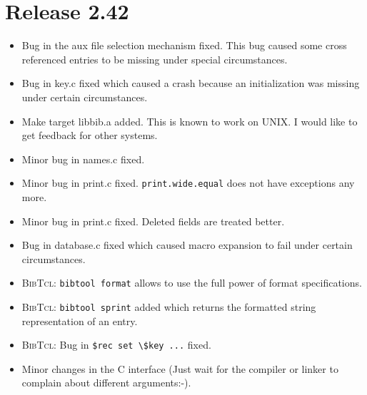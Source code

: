 \documentclass[11pt,a4paper]{scrartcl}
\newcommand\rsc[1]{\texttt{#1}}
\newcommand\File[1]{\textsf{#1}}
\newcommand\BibTcl{\textsc{BibTcl}}
\newenvironment{Release}[2]{\section*{Release #1}\begin{itemize}}{\end{itemize}}
\newenvironment{Fix}[1]{\item }{}
\newenvironment{New}[1]{\item }{}
\newenvironment{Update}[1]{\item }{}
\begin{document}
\begin{Release}{2.42}{}
  \begin{Fix}{gene}
    Bug in the aux file selection mechanism fixed. This bug caused some cross
    referenced entries to be missing under special circumstances.
  \end{Fix}
  \begin{Fix}{gene}
    Bug in \File{key.c} fixed which caused a crash because an
    initialization was missing under certain circumstances.
  \end{Fix}
  \begin{New}{gene}
    Make target \File{libbib.a} added. This is known to work on UNIX. I would
    like to get feedback for other systems.
  \end{New}
  \begin{Fix}{gene}
    Minor bug in \File{names.c} fixed.
  \end{Fix}
  \begin{Fix}{gene}
    Minor bug in \File{print.c} fixed. \rsc{print.wide.equal} does not
    have exceptions any more.
  \end{Fix}
  \begin{Fix}{gene}
    Minor bug in \File{print.c} fixed. Deleted fields are treated better.
  \end{Fix}
  \begin{Fix}{gene}
    Bug in \File{database.c} fixed which caused macro expansion to fail under
    certain circumstances.
  \end{Fix}
  \begin{Update}{gene}
    \BibTcl: \verb|bibtool format| allows to use the full power of
    format specifications.
  \end{Update}
  \begin{New}{gene}
    \BibTcl: \verb|bibtool sprint| added which returns the formatted
    string representation of an entry.
  \end{New}
  \begin{Fix}{gene}
    \BibTcl: Bug in \verb|$rec set \$key ...| fixed.
  \end{Fix}
  \begin{Update}{gene}
    Minor changes in the C interface (Just wait for the compiler or
    linker to complain about different arguments:-).
  \end{Update}
 \end{Release}
\end{document}
